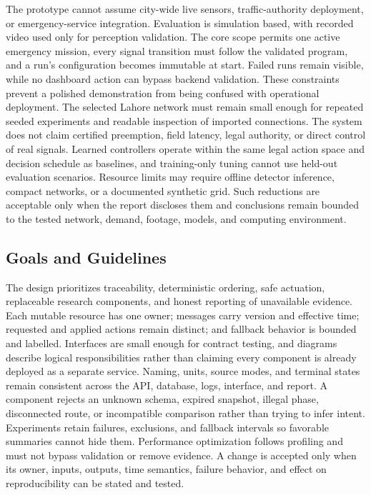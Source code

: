 The prototype cannot assume city-wide live sensors, traffic-authority deployment, or emergency-service integration. Evaluation is simulation based, with recorded video used only for perception validation. The core scope permits one active emergency mission, every signal transition must follow the validated program, and a run's configuration becomes immutable at start. Failed runs remain visible, while no dashboard action can bypass backend validation. These constraints prevent a polished demonstration from being confused with operational deployment. The selected Lahore network must remain small enough for repeated seeded experiments and readable inspection of imported connections. The system does not claim certified preemption, field latency, legal authority, or direct control of real signals. Learned controllers operate within the same legal action space and decision schedule as baselines, and training-only tuning cannot use held-out evaluation scenarios. Resource limits may require offline detector inference, compact networks, or a documented synthetic grid. Such reductions are acceptable only when the report discloses them and conclusions remain bounded to the tested network, demand, footage, models, and computing environment.

\subsection{Goals and Guidelines}

The design prioritizes traceability, deterministic ordering, safe actuation, replaceable research components, and honest reporting of unavailable evidence. Each mutable resource has one owner; messages carry version and effective time; requested and applied actions remain distinct; and fallback behavior is bounded and labelled. Interfaces are small enough for contract testing, and diagrams describe logical responsibilities rather than claiming every component is already deployed as a separate service. Naming, units, source modes, and terminal states remain consistent across the API, database, logs, interface, and report. A component rejects an unknown schema, expired snapshot, illegal phase, disconnected route, or incompatible comparison rather than trying to infer intent. Experiments retain failures, exclusions, and fallback intervals so favorable summaries cannot hide them. Performance optimization follows profiling and must not bypass validation or remove evidence. A change is accepted only when its owner, inputs, outputs, time semantics, failure behavior, and effect on reproducibility can be stated and tested.


